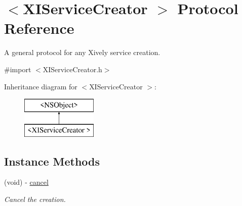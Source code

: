 \hypertarget{protocol_x_i_service_creator_01-p}{}\section{$<$X\+I\+Service\+Creator $>$ Protocol Reference}
\label{protocol_x_i_service_creator_01-p}


A general protocol for any Xively service creation.  




{\ttfamily \#import $<$X\+I\+Service\+Creator.\+h$>$}

Inheritance diagram for $<$X\+I\+Service\+Creator $>$\+:\begin{figure}[H]
\begin{center}
\leavevmode
\includegraphics[height=2.000000cm]{protocol_x_i_service_creator_01-p}
\end{center}
\end{figure}
\subsection*{Instance Methods}
\begin{DoxyCompactItemize}
\item 
(void) -\/ \hyperlink{protocol_x_i_service_creator_01-p_a0ec672223c33f574b85edd1c17576ac3}{cancel}
\begin{DoxyCompactList}\small\item\em Cancel the creation. \end{DoxyCompactList}\end{DoxyCompactItemize}
